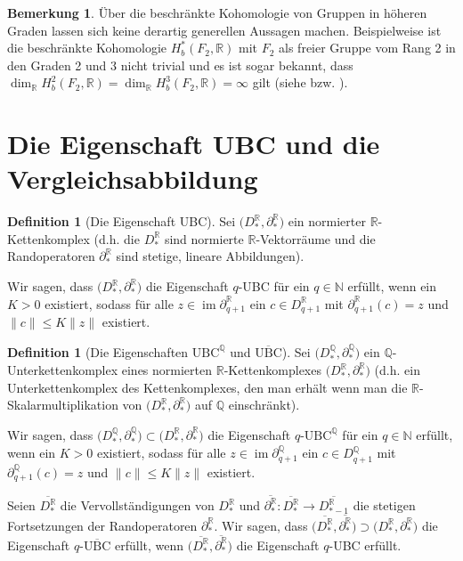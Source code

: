 \documentclass[a4paper,twoside,10pt]{scrreprt}
\DeclareMathOperator{\img}{im}
\newcommand{\N}{\mathbb{N}}
\newcommand{\Q}{\mathbb{Q}}
\newcommand{\R}{\mathbb{R}}
\theoremstyle{definition}
\newtheorem{definition}[satz]{Definition}
\newtheorem{bemerkung}[satz]{Bemerkung}
\begin{document}
\begin{bemerkung}
Über die beschränkte Kohomologie von Gruppen in höheren Graden lassen sich keine derartig generellen Aussagen machen.
Beispielweise ist die beschränkte Kohomologie $H_b^*(F_2,\R)$ mit $F_2$ als freier Gruppe vom Rang 2 in den Graden 2 und 3 nicht trivial und es ist sogar bekannt, dass $\dim_{\R}H_b^2(F_2,\R)=\dim_{\R}H_b^3(F_2,\R)=\infty$ gilt (siehe \cite{mitsumatsu} bzw. \cite{soma}).
\end{bemerkung}

\section{Die Eigenschaft UBC und die Vergleichsabbildung}\label{sec:UBCandComparisonMap}

\begin{definition}[Die Eigenschaft UBC]
Sei $\bigl(D_*^{\R},\partial_*^{\R}\bigr)$ ein normierter $\R$-Kettenkom\-plex (d.h. die $D_*^{\R}$ sind normierte $\R$-Vektorräume und die Randoperatoren $\partial_*^{\R}$ sind stetige, lineare Abbildungen).\par
Wir sagen, dass $\bigl(D_*^{\R},\partial_*^{\R}\bigr)$ die Eigenschaft $q$-UBC für ein $q\in \N$ erfüllt, wenn ein $K>0$ existiert, sodass für alle $z\in \img\partial_{q+1}^{\R}$ ein $c\in D_{q+1}^{\R}$ mit $\partial_{q+1}^{\R}(c)=z$ und $\|c\|\leq K\|z\|$ existiert.
\end{definition}

\begin{definition}[Die Eigenschaften $\text{UBC}^{\Q}$ und $\overline{\text{UBC}}$]\label{def:DefUBCProperty}
Sei $\bigl(D_*^{\Q},\partial_*^{\Q}\bigr)$ ein $\Q$-Unter\-kettenkomplex eines normierten $\R$-Kettenkomplexes $\bigl(D_*^{\R},\partial_*^{\R}\bigr)$ (d.h. ein Unterkettenkomplex des Kettenkomplexes, den man erhält wenn man die $\R$-Skalarmultiplikation  von $\bigl(D_*^{\R},\partial_*^{\R}\bigr)$ auf $\Q$ einschränkt).\par
Wir sagen, dass $\bigl(D_*^{\Q},\partial_*^{\Q}\bigr)\subset \bigl(D_*^{\R},\partial_*^{\R}\bigr)$ die Eigenschaft $q$-$\text{UBC}^{\Q}$ für ein $q\in \N$ erfüllt, wenn ein $K>0$ existiert, sodass für alle $z\in \img\partial_{q+1}^{\Q}$ ein $c\in D_{q+1}^{\Q}$ mit $\partial_{q+1}^{\Q}(c)=z$ und $\|c\|\leq K\|z\|$ existiert.\par
Seien $\overline{D_*^{\R}}$ die Vervollständigungen von $D_*^{\R}$ und $\overline{\partial_*^{\R}}:\overline{D_*^{\R}}\to \overline{D_{*-1}^{\R}}$ die stetigen Fortsetzungen der Randoperatoren $\partial_*^{\R}$. Wir sagen, dass $\bigl(\overline{D_*^{\R}},\overline {\partial_*^{\R}}\bigr)\supset \bigl(D_*^{\R},\partial_*^{\R}\bigr)$ die Eigenschaft $q$-$\overline{\text{UBC}}$ erfüllt, wenn $\bigl(\overline{D_*^{\R}},\overline {\partial_*^{\R}}\bigr)$ die Eigenschaft $q$-UBC erfüllt.
\end{definition}
\end{document}
